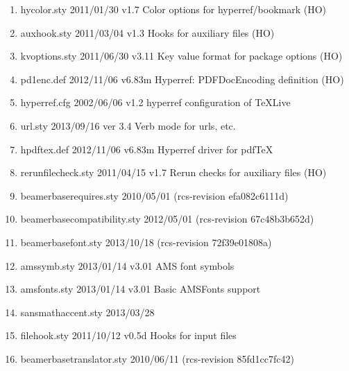 \begin{enumerate}
\item hycolor.sty 2011/01/30 v1.7 Color options for hyperref/bookmark (HO)
\item auxhook.sty 2011/03/04 v1.3 Hooks for auxiliary files (HO)
\item kvoptions.sty 2011/06/30 v3.11 Key value format for package options (HO)
\item pd1enc.def 2012/11/06 v6.83m Hyperref: PDFDocEncoding definition (HO)
\item hyperref.cfg 2002/06/06 v1.2 hyperref configuration of TeXLive
\item url.sty 2013/09/16 ver 3.4 Verb mode for urls, etc.
\item hpdftex.def 2012/11/06 v6.83m Hyperref driver for pdfTeX
\item rerunfilecheck.sty 2011/04/15 v1.7 Rerun checks for auxiliary files (HO)
\item beamerbaserequires.sty 2010/05/01 (rcs-revision efa082c6111d)
\item beamerbasecompatibility.sty 2012/05/01 (rcs-revision 67c48b3b652d)
\item beamerbasefont.sty 2013/10/18 (rcs-revision 72f39e01808a)
\item amssymb.sty 2013/01/14 v3.01 AMS font symbols
\item amsfonts.sty 2013/01/14 v3.01 Basic AMSFonts support
\item sansmathaccent.sty 2013/03/28
\item filehook.sty 2011/10/12 v0.5d Hooks for input files
\item beamerbasetranslator.sty 2010/06/11 (rcs-revision 85fd1cc7fc42)

\end{enumerate}
